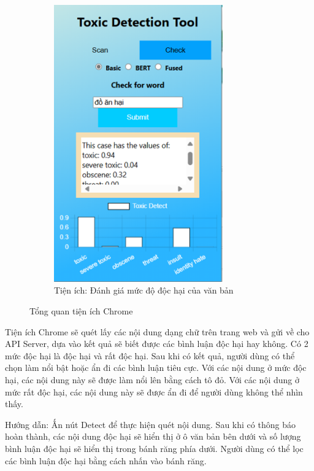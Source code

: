 \begin{figure}[htb!]
\begin{subfigure}[b]{0.33\textwidth}
        \includegraphics[width=0.8\textwidth]{image/ex_text_eval.png}
        \caption{Tiện ích: Đánh giá mức độ độc hại của văn bản}
        \label{figure:ex_text_eval}
    \end{subfigure}
    \caption{Tổng quan tiện ích Chrome}
\end{figure}

Tiện ích Chrome sẽ quét lấy các nội dung dạng chữ trên trang web và gửi về cho API Server, dựa vào kết quả sẽ biết được các bình luận độc hại hay không. Có 2 mức độc hại là độc hại và rất độc hại. Sau khi có kết quả, người dùng có thể chọn làm nổi bật hoặc ẩn đi các bình luận tiêu cực. Với các nội dung ở mức độc hại, các nội dung này sẽ được làm nổi lên bằng cách tô đỏ. Với các nội dung ở mức rất độc hại, các nội dung này sẽ được ẩn đi để người dùng không thể nhìn thấy.

Hướng dẫn: Ấn nút Detect để thực hiện quét nội dung. Sau khi có thông báo hoàn thành, các nội dung độc hại sẽ hiển thị ở ô văn bản bên dưới và số lượng bình luận độc hại sẽ hiển thị trong bánh răng phía dưới. Người dùng có thể lọc các bình luận độc hại bằng cách nhấn vào bánh răng.

